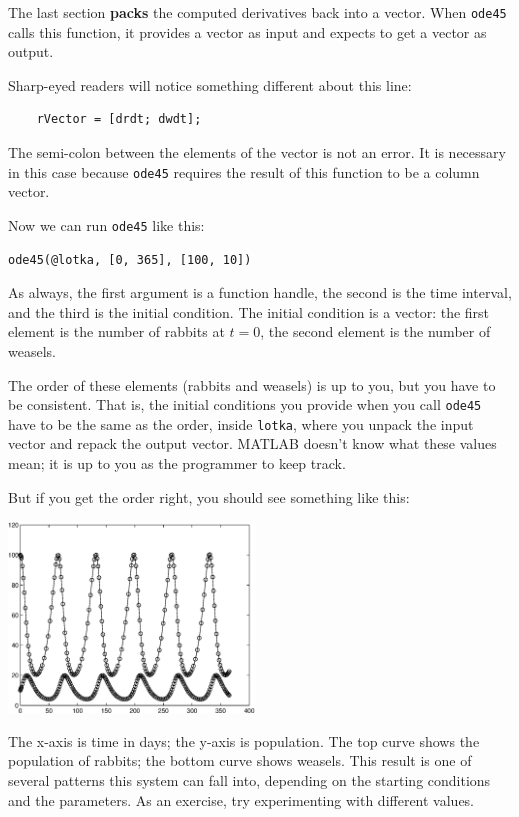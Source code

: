 \documentclass[
]{book}
\begin{document}
The last section {\bf packs} the computed derivatives back into a
vector.  When {\tt ode45} calls this function, it provides a vector
as input and expects to get a vector as output.

Sharp-eyed readers will notice something different about this line:

\begin{verbatim}
    rVector = [drdt; dwdt];
\end{verbatim}

The semi-colon between the elements of the vector is not an error.  It
is necessary in this case because {\tt ode45} requires the result of
this function to be a column vector.

Now we can run {\tt ode45} like this:

\begin{verbatim}
ode45(@lotka, [0, 365], [100, 10])
\end{verbatim}

As always, the first argument is a function handle, the second is the
time interval, and the third is the initial condition.  The initial
condition is a vector: the first element is the number of rabbits at
$t=0$, the second element is the number of weasels.

The order of these elements (rabbits and weasels) is up to you, but
you have to be consistent.  That is, the initial conditions you
provide when you call {\tt ode45} have to be the same as the order,
inside {\tt lotka}, where you unpack the input vector and repack
the output vector.  MATLAB doesn't know what these values mean;
it is up to you as the programmer to keep track.

But if you get the order right, you should see something like this:

\beforefig \centerline{\includegraphics[height=2in]{figs/lotka.eps}}

The x-axis is time in days; the y-axis is population.  The top
curve shows the population of rabbits; the bottom curve shows
weasels.  This result is one of several patterns
this system can fall into, depending on the starting conditions
and the parameters.  As an exercise, try experimenting with
different values.
\end{document}
